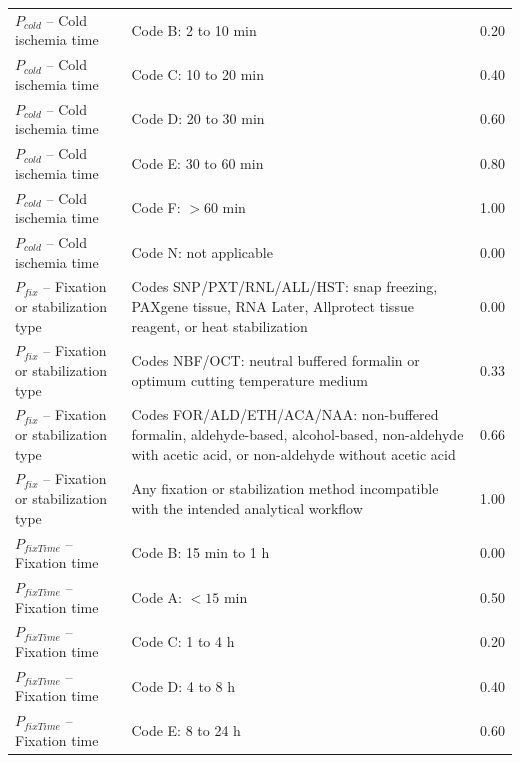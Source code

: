 \documentclass[preprint,12pt]{elsarticle}
\begin{document}
\begin{longtable}{@{}p{3.0cm}p{8.2cm}p{1.2cm}@{}}
\(P_{cold}\) -- Cold ischemia time
& Code B: 2 to 10 min
& 0.20 \\

\(P_{cold}\) -- Cold ischemia time
& Code C: 10 to 20 min
& 0.40 \\

\(P_{cold}\) -- Cold ischemia time
& Code D: 20 to 30 min
& 0.60 \\

\(P_{cold}\) -- Cold ischemia time
& Code E: 30 to 60 min
& 0.80 \\

\(P_{cold}\) -- Cold ischemia time
& Code F: \(>60\) min
& 1.00 \\

\(P_{cold}\) -- Cold ischemia time
& Code N: not applicable
& 0.00 \\

\midrule

\(P_{fix}\) -- Fixation or stabilization type
& Codes SNP/PXT/RNL/ALL/HST: snap freezing, PAXgene tissue, RNA Later, Allprotect tissue reagent, or heat stabilization
& 0.00 \\

\(P_{fix}\) -- Fixation or stabilization type
& Codes NBF/OCT: neutral buffered formalin or optimum cutting temperature medium
& 0.33 \\

\(P_{fix}\) -- Fixation or stabilization type
& Codes FOR/ALD/ETH/ACA/NAA: non-buffered formalin, aldehyde-based, alcohol-based, non-aldehyde with acetic acid, or non-aldehyde without acetic acid
& 0.66 \\

\(P_{fix}\) -- Fixation or stabilization type
& Any fixation or stabilization method incompatible with the intended analytical workflow
& 1.00 \\

\midrule

\(P_{fixTime}\) -- Fixation time
& Code B: 15 min to 1 h
& 0.00 \\

\(P_{fixTime}\) -- Fixation time
& Code A: \(<15\) min
& 0.50 \\

\(P_{fixTime}\) -- Fixation time
& Code C: 1 to 4 h
& 0.20 \\

\(P_{fixTime}\) -- Fixation time
& Code D: 4 to 8 h
& 0.40 \\

\(P_{fixTime}\) -- Fixation time
& Code E: 8 to 24 h
& 0.60 \\


\end{longtable}
\end{document}
